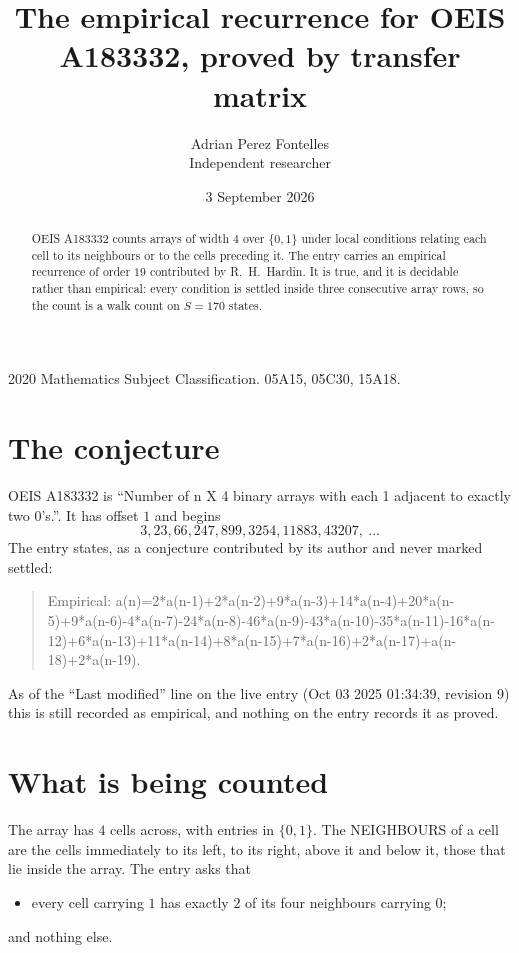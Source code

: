 \documentclass[11pt,a4paper]{article}
\title{The empirical recurrence for OEIS A183332, proved by transfer matrix}
\author{Adrian Perez Fontelles\\ \small Independent researcher}
\date{3 September 2026}
\theoremstyle{plain}
\theoremstyle{definition}
\begin{document}
\maketitle

\begin{abstract}
OEIS A183332 counts arrays of width $4$ over $\{0,1\}$ under local conditions relating each cell
to its neighbours or to the cells preceding it. The entry carries an empirical recurrence of
order $19$ contributed by R.~H.~Hardin. It is true, and it is decidable rather than
empirical: every condition is settled inside three consecutive array rows, so the count is a
walk count on $S=170$ states.
\end{abstract}

\noindent\small 2020 Mathematics Subject Classification. 05A15, 05C30, 15A18.\normalsize

\section{The conjecture}

OEIS A183332 is ``Number of n X 4 binary arrays with each 1 adjacent to exactly two 0's.''. It has offset $1$ and begins
\[
3, 23, 66, 247, 899, 3254, 11883, 43207,\ \dots
\]
The entry states, as a conjecture contributed by its author and never marked settled:
\begin{quote}
Empirical: a(n)=2*a(n-1)+2*a(n-2)+9*a(n-3)+14*a(n-4)+20*a(n-5)+9*a(n-6)-4*a(n-7)-24*a(n-8)-46*a(n-9)-43*a(n-10)-35*a(n-11)-16*a(n-12)+6*a(n-13)+11*a(n-14)+8*a(n-15)+7*a(n-16)+2*a(n-17)+a(n-18)+2*a(n-19).
\end{quote}
As of the ``Last modified'' line on the live entry (Oct 03 2025 01:34:39, revision 9) this is still
recorded as empirical, and nothing on the entry records it as proved.

\section{What is being counted}

The array has $4$ cells across, with entries in $\{0,1\}$. The NEIGHBOURS of a cell are the
cells immediately to its left, to its right, above it and below it, those that lie inside the
array. The entry asks that
\begin{itemize}
\item every cell carrying $1$ has exactly $2$ of its four neighbours carrying $0$;
\end{itemize}
and nothing else.
\end{document}

